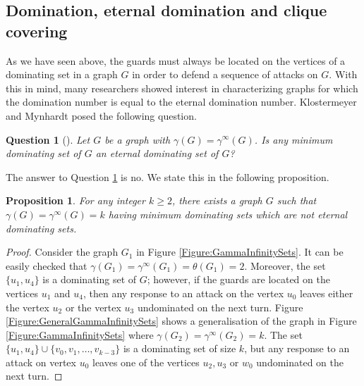 \documentclass[11pt]{article}
\newtheorem{que}[thm]{Question}
\newtheorem{prop}[thm]{Proposition}
\begin{document}
	
	\subsection{Domination, eternal domination and clique covering} \label{Section:DominationEternalDomination}
	
	As we have seen above, the guards must always be located on the vertices of a dominating set in a graph $G$ in order to defend a sequence of attacks on $G$. With this in mind, many researchers showed interest in characterizing graphs for which the domination number is equal to the eternal domination number. Klostermeyer and Mynhardt \cite{klostermeyer2020eternal} posed the following question.
	
	\begin{que} [\cite{klostermeyer2020eternal}] \label{Question:GammaSetsGeneral}
		Let $G$ be a graph with $\gamma(G)=\gamma^\infty(G)$. Is any minimum dominating set of $G$ an eternal dominating set of $G$?
	\end{que}
	
	The answer to Question \ref{Question:GammaSetsGeneral} is no. We state this in the following proposition.
	
	\begin{prop}
		For any integer $k \geq 2$, there exists a graph $G$ such that $\gamma(G)=\gamma^\infty(G)=k$ having minimum dominating sets which are not eternal dominating sets.	
	\end{prop}
	
	\begin{proof}
	Consider the graph $G_1$ in Figure \ref{Figure:GammaInfinitySets}. It can be easily checked that $\gamma(G_1)=\gamma^\infty(G_1)=\theta(G_1)=2$. Moreover, the set $\{u_1, u_4\}$ is a dominating set of $G$; however, if the guards are located on the vertices $u_1$ and $u_4$, then any response to an attack on the vertex $u_0$ leaves either the vertex $u_2$ or the vertex $u_3$ undominated on the next turn. Figure \ref{Figure:GeneralGammaInfinitySets} shows a generalisation of the graph in Figure \ref{Figure:GammaInfinitySets} where $\gamma(G_2)=\gamma^\infty(G_2)=k$. The set $\{u_1, u_4\} \cup \{v_0, v_1, \ldots, v_{k-3}\}$ is a dominating set of size $k$, but any response to an attack on vertex $u_0$ leaves one of the vertices $u_2, u_3$ or $w_0$ undominated on the next turn.
	\end{proof}
	
\end{document}

